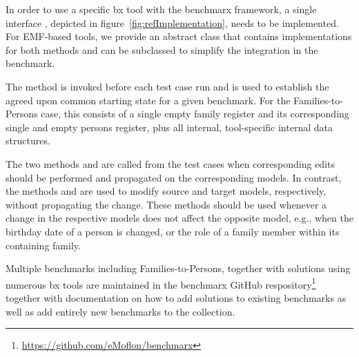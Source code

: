 In order to use a specific bx tool with the benchmarx framework, a single interface , depicted in figure~\ref{fig:refImplementation}, needs to be implemented.
For EMF-based tools, we provide an abstract class  that contains implementations for both  methods and can be subclassed to simplify the integration in the benchmark.

The method  is invoked before each test case run and is used to establish the agreed upon common starting state for a given benchmark.
For the Families-to-Persons case, this consists of a single empty family register and its corresponding single and empty persons register, plus all internal, tool-specific internal data structures. 

The two methods  and  are called from the test cases when corresponding edits should be performed and propagated on the corresponding models. 
In contrast, the methods  and  are used to modify source and target models, respectively, without propagating the change.
These methods should be used whenever a change in the respective models does not affect the opposite model, e.g., when the birthday date of a person is changed, or the role of a family member within its containing family.

Multiple benchmarks including Families-to-Persons, together with solutions using numerous bx tools are maintained in the benchmarx GitHub respository\footnote{\url{https://github.com/eMoflon/benchmarx}} together with documentation on how to add solutions to existing benchmarks as well as add entirely new benchmarks to the collection.